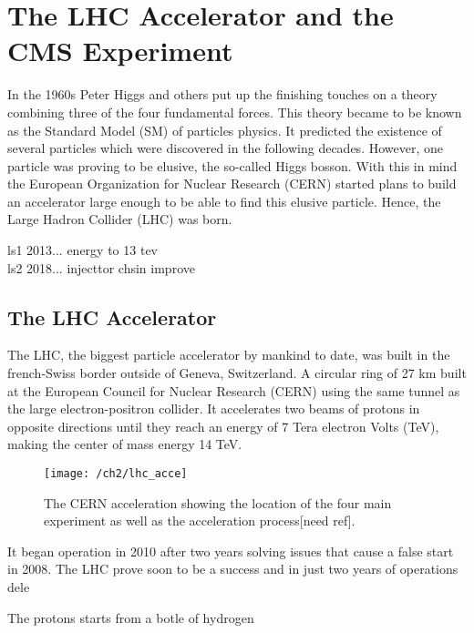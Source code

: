
\chapter{The LHC Accelerator and the CMS Experiment}\label{ch:lhcandcms}
In the 1960s Peter Higgs and others {\color{red}} put up the finishing touches on a theory combining three of the four fundamental forces. This theory became to be known as the Standard Model (SM) of particles physics. It predicted the existence of several particles which were discovered in the following decades. However, one particle was proving to be elusive, the so-called Higgs bosson. With this in mind the European Organization for Nuclear Research (CERN) started plans to build an accelerator large enough to be able to find this elusive particle. Hence, the Large Hadron Collider (LHC) was born. 


ls1 2013... energy to 13 tev\\
ls2 2018... injecttor chsin improve
\section{The LHC Accelerator}
The LHC, the biggest particle accelerator {} by mankind to date, was built in the french-Swiss border outside of Geneva, Switzerland. A circular ring of 27 km built at the European Council for Nuclear Research (CERN) using the same tunnel as the large electron-positron collider. It accelerates two beams of protons in opposite directions until they reach an energy of 7 Tera electron Volts (TeV), making the center of mass energy 14 TeV. 
 

\begin{figure}[!h]
	\centering
	\texttt{[image: /ch2/lhc\_acce]}
	\caption[The CERN acceleration ]{The CERN acceleration  showing the location of the four main experiment as well as the acceleration process[need ref].}
	\label{fig:cern}
\end{figure}

It began operation in 2010 after two years solving issues that cause a false start in 2008. The LHC prove soon to be a success and in just two years of operations dele  



The protons starts from a botle of hydrogen 

